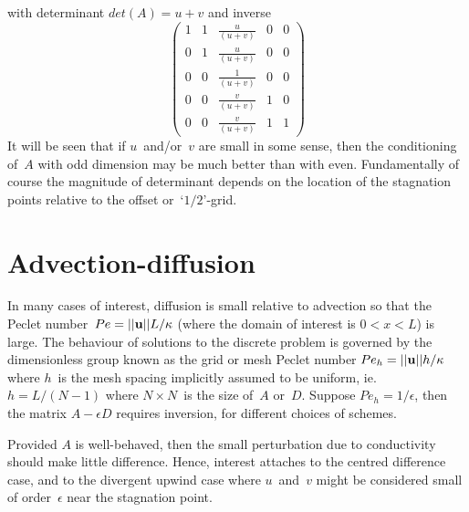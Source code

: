 with determinant $det(A)=u+v$ and inverse
\begin{equation}\label{eq:matd4}
\begin{pmatrix}
1 & 1 & \frac{u}{(u+v)} & 0 & 0\\
0 & 1 & \frac{u}{(u+v)} & 0 & 0\\
0 & 0 & \frac{1}{(u+v)} & 0 & 0\\
0 & 0 & \frac{v}{(u+v)} & 1 & 0\\
0 & 0 & \frac{v}{(u+v)} & 1 & 1
\end{pmatrix}
\end{equation}
It will be seen that if $u$~and/or~$v$ are small in some sense, then the conditioning of~$A$
with odd dimension may be much better than with even. Fundamentally of course the magnitude of
determinant depends on the location of the stagnation points relative to the offset or~`$1/2$'-grid.

\section{Advection-diffusion}\label{sec:addi}
In many cases of interest, diffusion is small relative to advection so that the Peclet
number~$Pe=||{\bf u}||  L/\kappa$ (where the domain of interest is $0<x<L$) is large.
The behaviour of solutions to the discrete problem is governed by the dimensionless
group known as the grid or mesh Peclet number $Pe_h=||{\bf u}|| h/\kappa$ where $h$~is the
mesh spacing implicitly assumed to be uniform, ie.\  $h=L/(N-1)$ where $N\times N$~is
the size of~$A$ or~$D$. Suppose $Pe_h=1/\epsilon$, then the matrix $A-\epsilon D$ 
requires inversion, for different choices of schemes.

Provided $A$ is well-behaved, then the small perturbation due to conductivity should make
little difference. Hence, interest attaches to the centred difference case, and to the
divergent upwind case where $u$~and~$v$ might be considered small of order~$\epsilon$
near the stagnation point.

